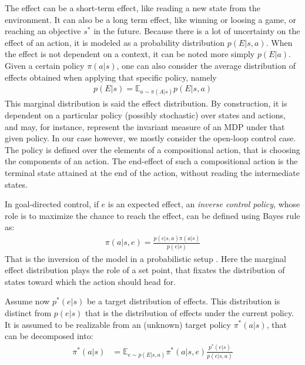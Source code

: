 \documentclass[runningheads]{llncs}
\begin{document}
The effect can be a short-term effect, like reading a new state from the environment. It can also be a long term effect, like winning or loosing a game, or reaching an objective $s^*$ in the future. Because there is a lot of uncertainty on the effect of an action, it is modeled as a probability distribution $p(E|s,a)$.
When the effect is not dependent on a context, it can be noted more simply $p(E|a)$.
Given a certain policy $\pi(a|s)$, one can also consider the average distribution of effects obtained when applying that specific policy, namely 
\begin{align}\label{eq:effect-model}
p(E|s) = \mathbb{E}_{a\sim \pi(A|s)} p(E|s,a)
\end{align}  
This marginal distribution is said the effect distribution. By construction, it is dependent on a particular policy (possibly stochastic) over states and actions, and may, for instance, represent the invariant measure of an MDP under that given policy. In our case however, we mostly consider the open-loop control case. The policy is defined over the elements of a compositional action, that is choosing the components of an action. The end-effect of such a compositional action is the terminal state attained at the end of the action, without reading the intermediate states.  
   

In goal-directed control, if $e$ is an expected effect, an \emph{inverse control policy}, whose role is to maximize the chance to reach the effect, can be defined using Bayes rule as:
\begin{align}\label{eq:inv-policy}
\pi(a|s,e) = \frac{p(e|s,a)\pi(a|s)}{p(e|s)}
\end{align}
That is the inversion of the model in a probabilistic setup \cite{bays2007computational}. Here the marginal effect distribution plays the role of a set point, that fixates the distribution of states toward which the action should head for.
%


Assume now $p^*(e|s)$ be a target distribution of effects. This distribution is distinct from  $p(e|s)$ that is the distribution of effects under the current policy. It is assumed to be realizable from an (unknown) target policy $\pi^*(a|s)$, that can be decomposed into:
\begin{align}
\pi^*(a|s) &= \mathbb{E}_{e\sim p(E|s,a)} \pi^*(a|s,e)\frac{p^*(e|s)}{p(e|s,a)}
\end{align}
\end{document}
